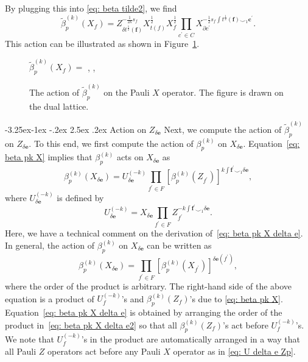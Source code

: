 \documentclass[aps,twocolumn,prx,floatfix,preprintnumbers, nofootinbib,10pt]{revtex4-2}
\makeatletter
\numberwithin{equation}{section}
\theoremstyle{definition}
\theoremstyle{remark}
\theoremstyle{claim}
\renewcommand\subsubsection{\@startsection{subsubsection}{3}{\z@}%
                                     {-3.25ex\@plus -1ex \@minus -.2ex}%
                                     {2.5ex \@plus .2ex}%
                                     {\centering\itshape\bfseries\small}}
\makeatother
\begin{document}
By plugging this into \eqref{eq: beta tilde2}, we find
\begin{equation}
\tilde{\beta}_{p}^{(k)}(X_f) = Z_{\delta t^{\frac{1}{2}}(\bm{f})}^{-\frac{1}{2k}s_f} X_{t(f)}^{\frac{1}{2}} X_f^{\frac{1}{2}} \prod_{c^{\prime} \in C} X_{\partial c^{\prime}}^{-\frac{1}{2}s_f \int t^{\frac{1}{2}}(\bm{f}) \smile_1 \bm{c}^{\prime}}.
\label{eq: beta tilde X}
\end{equation}
This action can be illustrated as shown in Figure~\ref{fig: beta tilde X}.
\begin{figure}[t]
\centering
$\tilde{\beta}_p^{(k)}(X_f) =$
,
,
\caption{The action of $\tilde{\beta}_p^{(k)}$ on the Pauli $X$ operator. The figure is drawn on the dual lattice.}
\label{fig: beta tilde X}
\end{figure}

\subsubsection{\texorpdfstring{Action on $Z_{\delta \bm{e}}$}{Action on Z delta e}}
Next, we compute the action of $\tilde{\beta}_p^{(k)}$ on $Z_{\delta \bm{e}}$.
To this end, we first compute the action of $\beta_p^{(k)}$ on $X_{\delta \bm{e}}$.
Equation~\eqref{eq: beta pk X} implies that $\beta_p^{(k)}$ acts on $X_{\delta \bm{e}}$ as
\begin{equation}
\beta_p^{(k)}(X_{\delta \bm{e}}) = U_{\delta \bm{e}}^{(-k)} \prod_{f^{\prime} \in F} \left[ \beta_p^{(k)}(Z_{f^{\prime}}) \right]^{k \int \bm{f}^{\prime} \smile_1 \delta \bm{e}},
\label{eq: beta pk X delta e}
\end{equation}
where $U_{\delta \bm{e}}^{(-k)}$ is defined by
\begin{equation}
U_{\delta \bm{e}}^{(-k)} = X_{\delta \bm{e}} \prod_{f^{\prime} \in F} Z_{f^{\prime}}^{-k \int \bm{f}^{\prime} \smile_1 \delta \bm{e}}.
\label{eq: U delta e Zp}
\end{equation}
Here, we have a technical comment on the derivation of~\eqref{eq: beta pk X delta e}.
In general, the action of $\beta_p^{(k)}$ on $X_{\delta \bm{e}}$ can be written as
\begin{equation}
\beta_p^{(k)}(X_{\delta \bm{e}}) = \prod_{f^{\prime} \in F} \left[\beta_p^{(k)}(X_{f^{\prime}})\right]^{\delta \bm{e}(f^{\prime})},
\label{eq: beta pk X delta e2}
\end{equation}
where the order of the product is arbitrary.
The right-hand side of the above equation is a product of $U_f^{(-k)}$'s and $\beta_p^{(k)}(Z_f)$'s due to \eqref{eq: beta pk X}.
Equation~\eqref{eq: beta pk X delta e} is obtained by arranging the order of the product in~\eqref{eq: beta pk X delta e2} so that all $\beta_p^{(k)}(Z_f)$'s act before $U_f^{(-k)}$'s.
We note that $U_f^{(-k)}$'s in the product are automatically arranged in a way that all Pauli $Z$ operators act before any Pauli $X$ operator as in \eqref{eq: U delta e Zp}.
\end{document}
